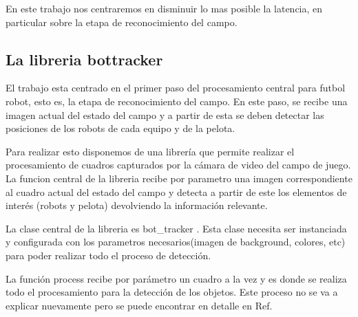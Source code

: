 \documentclass[a4paper,10pt]{report}
\begin{document}
En este trabajo nos centraremos en disminuir lo mas posible la latencia, en particular sobre la etapa de reconocimiento del campo.






\subsection{La libreria bottracker}

El trabajo esta centrado en el primer paso del procesamiento central para futbol robot, esto es, la etapa de reconocimiento del campo. 
En este paso, se recibe una imagen actual del estado del campo y a partir de esta se deben detectar las posiciones de los robots de cada equipo y de la pelota.


Para realizar esto disponemos de una librería \cite{Jaureguiberry} que permite realizar el procesamiento de cuadros capturados por la cámara de video del campo de juego. 
La funcion central de la libreria recibe por parametro una imagen correspondiente al cuadro actual del estado del campo y detecta a partir de este los elementos de interés 
(robots y pelota) devolviendo la información relevante. 



La clase central de la libreria es bot\_tracker \cite[]{Jaureguiberry}. 
Esta clase necesita ser instanciada y configurada con los parametros necesarios(imagen de background, colores, etc) para poder realizar todo el proceso de detección.


La función process recibe por parámetro un cuadro a la vez y es donde se realiza todo el procesamiento para la detección de los objetos.
Este proceso no se va a explicar nuevamente pero se puede encontrar en detalle en Ref. \cite[capitulo 5]{Jaureguiberry}
\end{document}
